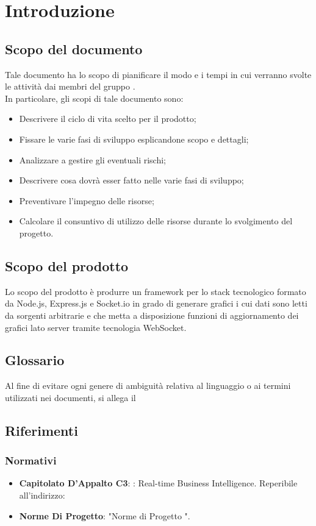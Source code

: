 \section{Introduzione}
	\subsection{Scopo del documento}
		Tale documento ha lo scopo di pianificare il modo e i tempi in cui verranno svolte le attività dai membri del gruppo \groupname. \\In particolare, gli scopi di tale documento sono:
		\begin{itemize}
			\item Descrivere il ciclo di vita scelto per il prodotto;
			\item Fissare le varie fasi di sviluppo esplicandone scopo e dettagli;
			\item Analizzare a gestire gli eventuali rischi;
			\item Descrivere cosa dovrà esser fatto nelle varie fasi di sviluppo;
			\item Preventivare l'impegno delle risorse;
			\item Calcolare il consuntivo di utilizzo delle risorse durante lo svolgimento del progetto.
		\end{itemize}
	\subsection{Scopo del prodotto}
		Lo scopo del prodotto è produrre un framework per lo stack tecnologico formato da Node.js, Express.js e Socket.io in grado di generare grafici i cui dati sono letti da sorgenti arbitrarie e che metta a disposizione funzioni di aggiornamento dei grafici lato server tramite tecnologia WebSocket.
	\subsection{Glossario}
		Al fine di evitare ogni genere di ambiguità relativa al linguaggio o ai termini utilizzati nei documenti, si allega il 
	\subsection{Riferimenti}
		\subsubsection{Normativi}
			\begin{itemize}
				\item\textbf{Capitolato D'Appalto C3}: \projectname: Real-time Business Intelligence. Reperibile all'indirizzo: 
				\item\textbf{Norme Di Progetto}: "Norme di Progetto \lastversion".
			\end{itemize}
